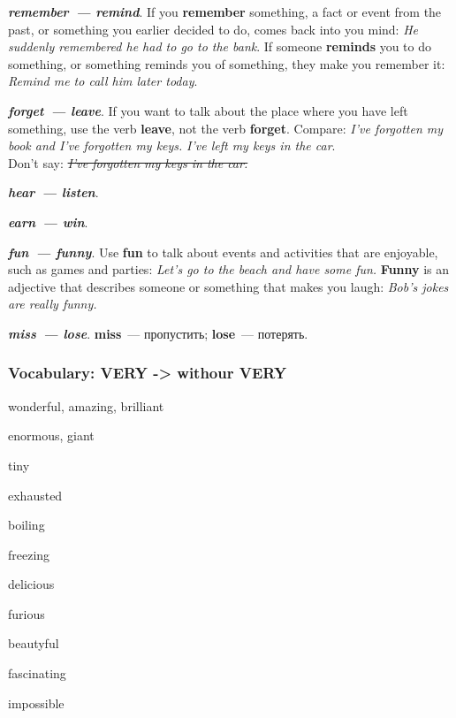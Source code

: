 \documentclass[10pt,a4paper]{article}
\newcommand\ex[1]{\textit{\textbf{{#1}}}}
\begin{document}
\ex{remember~--- remind}. If you \textbf{remember} something, a fact or event from the past,
or something you earlier decided to do, comes back into you mind:
\textit{He suddenly remembered he had to go to the bank}. If someone \textbf{reminds} you to
do something, or something reminds you of something, they make you remember it:
\textit{Remind me to call him later today}.


\ex{forget~--- leave}. If you want to talk about the place where you have left something, use the
verb \textbf{leave}, not the verb \textbf{forget}. Compare: \textit{I've forgotten my book and I've
forgotten my keys.} \textit{I've left my keys in the car}.\\
Don't say: \textit{\sout{I've forgotten my keys in the car.}}

\ex{hear~--- listen}.

\ex{earn~--- win}.

\ex{fun~--- funny}. Use \textbf{fun} to talk about events and activities that are enjoyable, such as
games and parties: \textit{Let's go to the beach and have some fun.} \textbf{Funny} is an adjective
that describes someone or something that makes you laugh: \textit{Bob's jokes are really funny.}

\ex{miss~--- lose}. \textbf{miss}~--- пропустить; \textbf{lose}~--- потерять.

\endgroup


\subsubsection{Vocabulary: VERY -> withour VERY}
\begingroup
\setlength{\columnsep}{19pt}
\begin{multicols}{2}
\begin{description}[leftmargin=1.6cm,style=nextline,before={\renewcommand\makelabel[1]{##1 ~---}}]
  \item[good] wonderful, amazing, brilliant
  \item[big] enormous, giant
  \item[small] tiny
  \item[tired] exhausted
  \item[hot] boiling
  \item[cold] freezing
  \item[tasty] delicious
  \item[angry] furious
  \item[pretty] beautyful
\end{description}

\begin{description}[leftmargin=2.3cm,style=nextline,before={\renewcommand\makelabel[1]{##1 ~---}}]
  \item[interesting] fascinating
  \item[difficult] impossible
\end{description}
\end{multicols}
\endgroup
\end{document}
